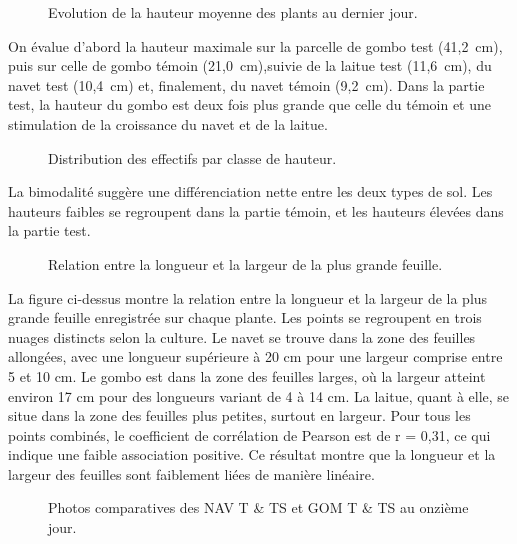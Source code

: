 \begin{figure}[H]
    \centering
    \caption{Evolution de la hauteur moyenne des plants au dernier jour. }
    \label{fig:hauteur-jourfin}
\end{figure}
On évalue d'abord la hauteur maximale sur la parcelle de gombo test (41{,}2~cm), puis sur celle de gombo témoin (21{,}0~cm),suivie de la laitue test (11{,}6~cm), du navet test (10{,}4~cm) et, finalement, du navet témoin (9{,}2~cm).
Dans la partie test, la hauteur du gombo est deux fois plus grande que celle du  témoin et une stimulation  de la croissance du navet et de la laitue.

\begin{figure}[H]
    \centering
    \caption{Distribution des effectifs par classe de hauteur. }
    \label{fig:effectif5}
\end{figure}
La bimodalité suggère une différenciation nette entre les deux types de sol. Les hauteurs faibles se regroupent dans la partie témoin, et les hauteurs élevées dans la partie test.

\begin{figure}[H]
    \centering
    \caption{Relation entre la longueur et la largeur de la plus grande feuille. }
    \label{fig:plus-G-feuille5}
\end{figure}
La figure ci-dessus montre la relation entre la longueur et la largeur de la plus grande feuille enregistrée sur chaque plante. 
Les points se regroupent en trois nuages distincts selon la culture. Le navet se trouve dans la zone des feuilles allongées, avec une longueur supérieure à 20 cm pour une largeur comprise entre 5 et 10 cm. 
Le gombo est dans la zone des feuilles larges, où la largeur atteint environ 17 cm pour des longueurs variant de 4 à 14 cm. La laitue, quant à elle, se situe dans la zone des feuilles plus petites, surtout en largeur. 
Pour tous les points combinés, le coefficient de corrélation de Pearson est de r = 0,31, ce qui indique une faible association positive. 
Ce résultat montre que la longueur et la largeur des feuilles sont faiblement liées de manière linéaire.

\begin{figure}[H]
    \centering
    \caption{Photos comparatives des NAV T \& TS et GOM T \& TS au onzième jour. }
    \label{fig:gom-nav-j11}
\end{figure}

